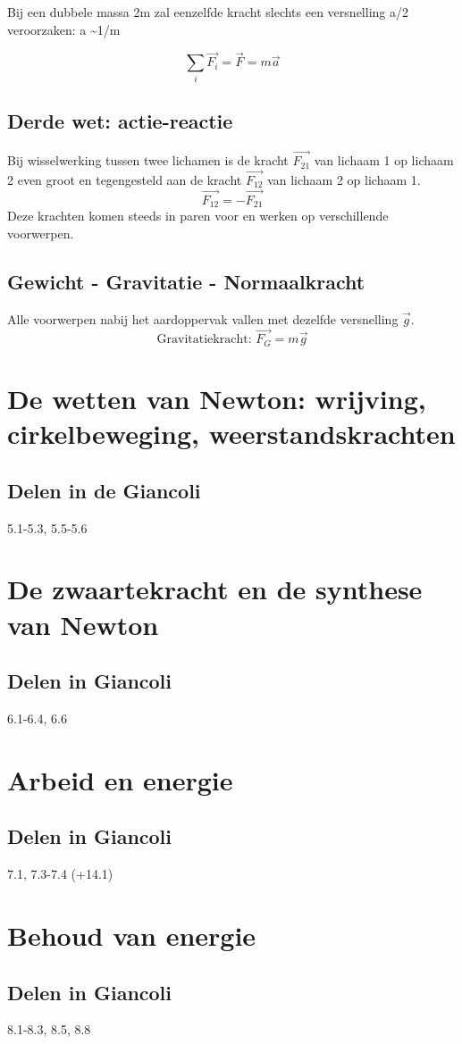 \documentclass[12pt,a4paper]{article}
\begin{document}
	Bij een dubbele massa 2m zal eenzelfde kracht slechts een versnelling a/2 veroorzaken: a \textasciitilde 1/m 
	
	\[\sum_{i} \vec{F_i} = \vec{F} = m\vec{a}\]
	\subsection{Derde wet: actie-reactie}
	Bij wisselwerking tussen twee lichamen is de kracht \(\vec{F_{21}}\) van lichaam 1 op lichaam 2 even groot en tegengesteld aan de kracht \(\vec{F_{12}}\) van lichaam 2 op lichaam 1.
	\[\vec{F_{12}} = -\vec{F_{21}}\]
	Deze krachten komen steeds in paren voor en werken op verschillende voorwerpen.
	\subsection{Gewicht - Gravitatie - Normaalkracht}
	Alle voorwerpen nabij het aardoppervak vallen met dezelfde versnelling $\vec{g}$. 
	\[\text{Gravitatiekracht: } \vec{F_G} = m\vec{g}\]	
	\section{De wetten van Newton: wrijving, cirkelbeweging, weerstandskrachten}
	\subsection{Delen in de Giancoli}
	5.1-5.3, 5.5-5.6
	\section{De zwaartekracht en de synthese van Newton}
	\subsection{Delen in Giancoli}
	6.1-6.4, 6.6
	\section{Arbeid en energie}
	\subsection{Delen in Giancoli}
	7.1, 7.3-7.4 (+14.1)
	\section{Behoud van energie}
	\subsection{Delen in Giancoli}
	8.1-8.3, 8.5, 8.8
\end{document}
